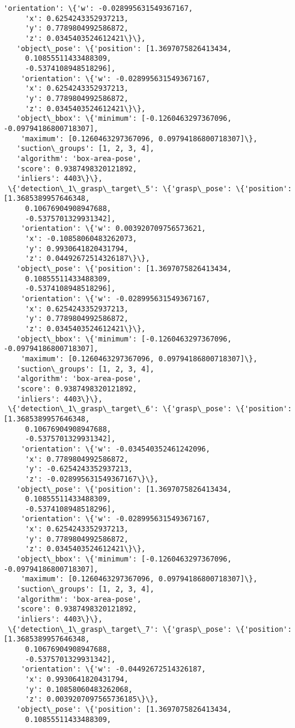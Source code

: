 \documentclass[11pt]{article}
\begin{document}
\begin{tcolorbox}[breakable, size=fbox, boxrule=.5pt, pad at break*=1mm, opacityfill=0]
\begin{Verbatim}[commandchars=\\\{\}]
    'orientation': \{'w': -0.028995631549367167,
     'x': 0.6254243352937213,
     'y': 0.7789804992586872,
     'z': 0.0345403524612421\}\},
   'object\_pose': \{'position': [1.3697075826413434,
     0.10855511433488309,
     -0.5374108948518296],
    'orientation': \{'w': -0.028995631549367167,
     'x': 0.6254243352937213,
     'y': 0.7789804992586872,
     'z': 0.0345403524612421\}\},
   'object\_bbox': \{'minimum': [-0.1260463297367096, -0.09794186800718307],
    'maximum': [0.1260463297367096, 0.09794186800718307]\},
   'suction\_groups': [1, 2, 3, 4],
   'algorithm': 'box-area-pose',
   'score': 0.9387498320121892,
   'inliers': 4403\}\},
 \{'detection\_1\_grasp\_target\_5': \{'grasp\_pose': \{'position': [1.3685389957646348,
     0.10676904908947688,
     -0.5375701329931342],
    'orientation': \{'w': 0.003920709756573621,
     'x': -0.10858060483262073,
     'y': 0.9930641820431794,
     'z': 0.04492672514326187\}\},
   'object\_pose': \{'position': [1.3697075826413434,
     0.10855511433488309,
     -0.5374108948518296],
    'orientation': \{'w': -0.028995631549367167,
     'x': 0.6254243352937213,
     'y': 0.7789804992586872,
     'z': 0.0345403524612421\}\},
   'object\_bbox': \{'minimum': [-0.1260463297367096, -0.09794186800718307],
    'maximum': [0.1260463297367096, 0.09794186800718307]\},
   'suction\_groups': [1, 2, 3, 4],
   'algorithm': 'box-area-pose',
   'score': 0.9387498320121892,
   'inliers': 4403\}\},
 \{'detection\_1\_grasp\_target\_6': \{'grasp\_pose': \{'position': [1.3685389957646348,
     0.10676904908947688,
     -0.5375701329931342],
    'orientation': \{'w': -0.034540352461242096,
     'x': 0.7789804992586872,
     'y': -0.6254243352937213,
     'z': -0.028995631549367167\}\},
   'object\_pose': \{'position': [1.3697075826413434,
     0.10855511433488309,
     -0.5374108948518296],
    'orientation': \{'w': -0.028995631549367167,
     'x': 0.6254243352937213,
     'y': 0.7789804992586872,
     'z': 0.0345403524612421\}\},
   'object\_bbox': \{'minimum': [-0.1260463297367096, -0.09794186800718307],
    'maximum': [0.1260463297367096, 0.09794186800718307]\},
   'suction\_groups': [1, 2, 3, 4],
   'algorithm': 'box-area-pose',
   'score': 0.9387498320121892,
   'inliers': 4403\}\},
 \{'detection\_1\_grasp\_target\_7': \{'grasp\_pose': \{'position': [1.3685389957646348,
     0.10676904908947688,
     -0.5375701329931342],
    'orientation': \{'w': -0.04492672514326187,
     'x': 0.9930641820431794,
     'y': 0.10858060483262068,
     'z': 0.0039207097565736185\}\},
   'object\_pose': \{'position': [1.3697075826413434,
     0.10855511433488309,

\end{Verbatim}
\end{tcolorbox}
\end{document}
